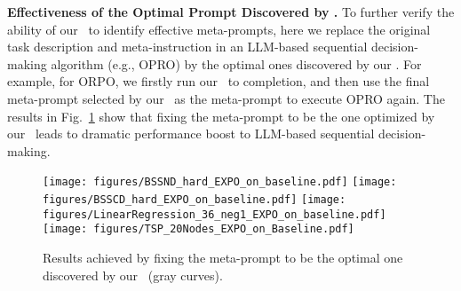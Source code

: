 \textbf{Effectiveness of the Optimal Prompt Discovered by \alg.}
To further verify the ability of our \alg~to identify effective meta-prompts, here we replace the original task description and meta-instruction in an LLM-based sequential decision-making algorithm (e.g., OPRO) by the optimal ones discovered by our \alg.
For example, for ORPO, we firstly run our \alg~to completion, and then use the final meta-prompt selected by our \alg~as the meta-prompt to execute OPRO again.
The results in Fig.~\ref{fig:optimal_prompt_on_tasks} show that fixing the meta-prompt to be the one optimized by our \alg~leads to dramatic performance boost to LLM-based sequential decision-making.
\begin{figure}[h]
\vspace{-3mm}
\centering
\texttt{[image: figures/BSSND\_hard\_EXPO\_on\_baseline.pdf]}
\texttt{[image: figures/BSSCD\_hard\_EXPO\_on\_baseline.pdf]}
\texttt{[image: figures/LinearRegression\_36\_neg1\_EXPO\_on\_baseline.pdf]}
\texttt{[image: figures/TSP\_20Nodes\_EXPO\_on\_Baseline.pdf]}
\vspace{-2mm}
\caption{
Results achieved by fixing the meta-prompt to be the optimal one discovered by
our \alg~(gray curves).
}
\label{fig:optimal_prompt_on_tasks}
\vspace{-3mm}
\end{figure}




